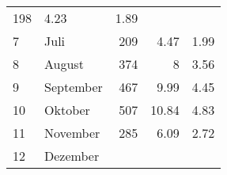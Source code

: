 \begin{longtable}{lXrrr}
       \num{198} &
       \num[round-mode=places,round-precision=2]{4,23} &
         \num[round-mode=places,round-precision=2]{1,89} \\

     7 &
     \multicolumn{1}{X}{ Juli   } &


       \num{209} &
       \num[round-mode=places,round-precision=2]{4,47} &
         \num[round-mode=places,round-precision=2]{1,99} \\

     8 &
     \multicolumn{1}{X}{ August   } &


       \num{374} &
       \num[round-mode=places,round-precision=2]{8} &
         \num[round-mode=places,round-precision=2]{3,56} \\

     9 &
     \multicolumn{1}{X}{ September   } &


       \num{467} &
       \num[round-mode=places,round-precision=2]{9,99} &
         \num[round-mode=places,round-precision=2]{4,45} \\

     10 &
     \multicolumn{1}{X}{ Oktober   } &


       \num{507} &
       \num[round-mode=places,round-precision=2]{10,84} &
         \num[round-mode=places,round-precision=2]{4,83} \\

     11 &
     \multicolumn{1}{X}{ November   } &


       \num{285} &
       \num[round-mode=places,round-precision=2]{6,09} &
         \num[round-mode=places,round-precision=2]{2,72} \\

     12 &
     \multicolumn{1}{X}{ Dezember   } &



\end{longtable}
